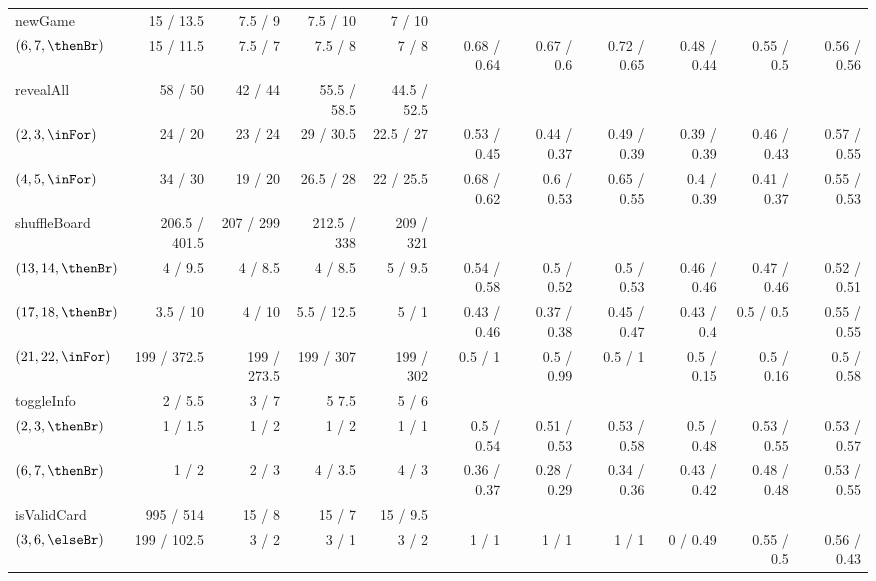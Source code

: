 \begin{table*}
{\begin{tabular}{l|rrrr|r|r|r|r|r|r}
    newGame             & 15 / 13.5   & 7.5 / 9   & 7.5 / 10    & 7 / 10   &             &             &             &             &            & \\
    $(6,7,\thenBr)$     & 15 / 11.5   & 7.5 / 7   & 7.5 / 8     & 7 / 8    & 0.68 / 0.64 & 0.67 / 0.6  & 0.72 / 0.65 & 0.48 / 0.44 & 0.55 / 0.5 & 0.56 / 0.56 \\
    \midrule
    revealAll           & 58 / 50     & 42 / 44   & 55.5 / 58.5 & 44.5 / 52.5 &             &             &             &             &             &\\
    $(2,3,\inFor)$      & 24 / 20     & 23 / 24   & 29 / 30.5   & 22.5 / 27   & 0.53 / 0.45 & 0.44 / 0.37 & 0.49 / 0.39 & 0.39 / 0.39 & 0.46 / 0.43 & 0.57 / 0.55 \\
    $(4,5,\inFor)$      & 34 / 30     & 19 / 20   & 26.5 / 28   & 22 / 25.5   & 0.68 / 0.62 & 0.6 / 0.53  & 0.65 / 0.55 & 0.4 / 0.39  & 0.41 / 0.37 & 0.55 / 0.53 \\
    \midrule
    shuffleBoard         & 206.5 / 401.5 & 207 / 299   & 212.5 / 338 & 209 / 321 &             &             &             &             &             & \\
    $(13,14,\thenBr)$    & 4 / 9.5       & 4 / 8.5     & 4 / 8.5     & 5 / 9.5   & 0.54 / 0.58 & 0.5 / 0.52  & 0.5 / 0.53  & 0.46 / 0.46 & 0.47 / 0.46 & 0.52 / 0.51 \\
    $(17,18,\thenBr)$    & 3.5 / 10      & 4 / 10      & 5.5 / 12.5  & 5 / 1     & 0.43 / 0.46 & 0.37 / 0.38 & 0.45 / 0.47 & 0.43 / 0.4  & 0.5 / 0.5   & 0.55 / 0.55 \\
    $(21,22,\inFor)$     & 199 / 372.5   & 199 / 273.5 & 199 / 307   & 199 / 302 & 0.5 / 1     & 0.5 / 0.99  & 0.5 / 1     & 0.5 / 0.15 & 0.5 / 0.16   & 0.5 / 0.58 \\
    \midrule
    \midrule
    toggleInfo         & 2 / 5.5 & 3 / 7 & 5  7.5  & 5 / 6 &             &             &             &             &             & \\
    $(2,3,\thenBr)$    & 1 / 1.5 & 1 / 2 & 1 / 2   & 1 / 1 & 0.5 / 0.54  & 0.51 / 0.53 & 0.53 / 0.58 & 0.5 / 0.48  & 0.53 / 0.55 & 0.53 / 0.57 \\
    $(6,7,\thenBr)$    & 1 / 2   & 2 / 3 & 4 / 3.5 & 4 / 3 & 0.36 / 0.37 & 0.28 / 0.29 & 0.34 / 0.36 & 0.43 / 0.42 & 0.48 / 0.48 & 0.53 / 0.55 \\
    \midrule
    \midrule
    isValidCard       & 995 / 514   & 15 / 8 & 15 / 7 & 15 / 9.5 &       &       &       &             &             & \\
    $(3,6,\elseBr)$   & 199 / 102.5 & 3 / 2  & 3 / 1  & 3 / 2    & 1 / 1 & 1 / 1 & 1 / 1 & 0 / 0.49    & 0.55 / 0.5  & 0.56 / 0.43 \\

\end{tabular}}
\end{table*}
